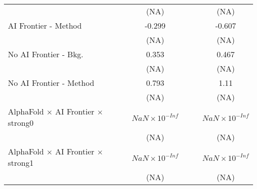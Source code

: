 \begin{tabular}{lcccccc}
                                                                              &                        &                        & (NA)                   &                        &                        & (NA)\\   
   AI Frontier - Method                                                       &                        &                        & -0.299                 &                        &                        & -0.607\\   
                                                                              &                        &                        & (NA)                   &                        &                        & (NA)\\   
   No AI Frontier - Bkg.                                                      &                        &                        & 0.353                  &                        &                        & 0.467\\   
                                                                              &                        &                        & (NA)                   &                        &                        & (NA)\\   
   No AI Frontier - Method                                                    &                        &                        & 0.793                  &                        &                        & 1.11\\   
                                                                              &                        &                        & (NA)                   &                        &                        & (NA)\\   
   AlphaFold $\times$ AI Frontier $\times$ strong0                            &                        &                        & $NaN\times 10^{-Inf}$  &                        &                        & $NaN\times 10^{-Inf}$\\    
                                                                              &                        &                        & (NA)                   &                        &                        & (NA)\\   
   AlphaFold $\times$ AI Frontier $\times$ strong1                            &                        &                        & $NaN\times 10^{-Inf}$  &                        &                        & $NaN\times 10^{-Inf}$\\    
                                                                              &                        &                        & (NA)                   &                        &                        & (NA)\\   

\end{tabular}
